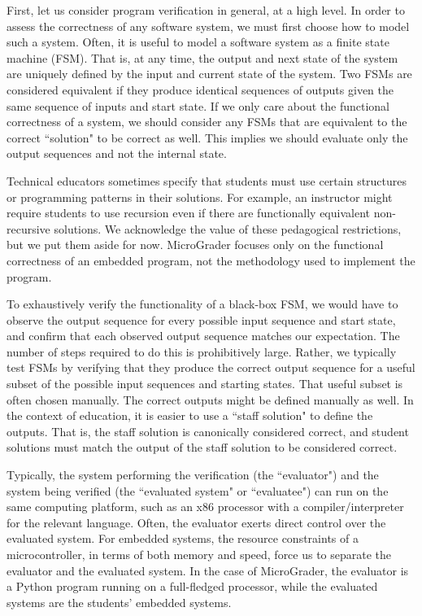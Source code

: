 \documentclass[12pt]{article}
\begin{document}
First, let us consider program verification in general, at a high level. In order to assess the correctness of any software system, we must first choose how to model such a system.  Often, it is useful to model a software system as a finite state machine (FSM).  That is, at any time, the output and next state of the system are uniquely defined by the input and current state of the system.  Two FSMs are considered equivalent if they produce identical sequences of outputs given the same sequence of inputs and start state.  If we only care about the functional correctness of a system, we should consider any FSMs that are equivalent to the correct ``solution" to be correct as well.  This implies we should evaluate only the output sequences and not the internal state.

Technical educators sometimes specify that students must use certain structures or programming patterns in their solutions.  For example, an instructor might require students to use recursion even if there are functionally equivalent non-recursive solutions.  We acknowledge the value of these pedagogical restrictions, but we put them aside for now.  MicroGrader focuses only on the functional correctness of an embedded program, not the methodology used to implement the program.

To exhaustively verify the functionality of a black-box FSM, we would have to observe the output sequence for every possible input sequence and start state, and confirm that each observed output sequence matches our expectation. The number of steps required to do this is prohibitively large.  Rather, we typically test FSMs by verifying that they produce the correct output sequence for a useful subset of the possible input sequences and starting states.  That useful subset is often chosen manually.  The correct outputs might be defined manually as well.  In the context of education, it is easier to use a ``staff solution" to define the outputs.  That is, the staff solution is canonically considered correct, and student solutions must match the output of the staff solution to be considered correct.
   
Typically, the system performing the verification (the ``evaluator") and the system being verified (the ``evaluated system" or ``evaluatee") can run on the same computing platform, such as an x86 processor with a compiler/interpreter for the relevant language.  Often, the evaluator exerts direct control over the evaluated system.  For embedded systems, the resource constraints of a microcontroller, in terms of both memory and speed, force us to separate the evaluator and the evaluated system.  In the case of MicroGrader, the evaluator is a Python program running on a full-fledged processor, while the evaluated systems are the students' embedded systems.
\end{document}
